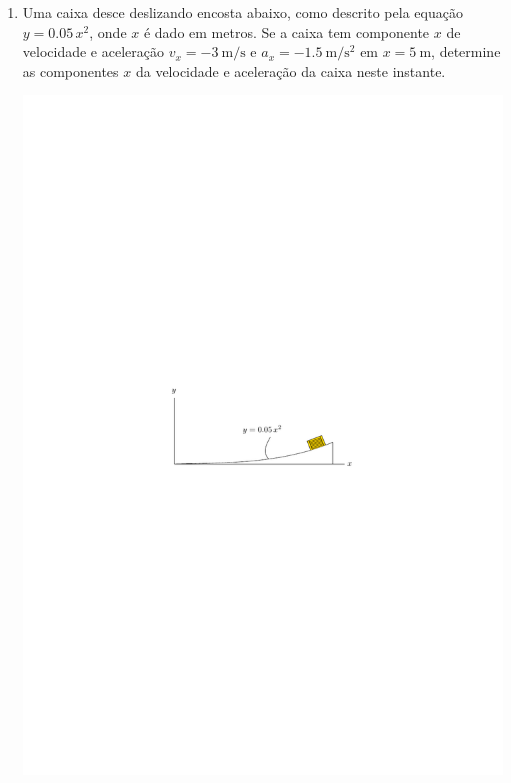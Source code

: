 \documentclass[a4paper,12pt]{article}
\begin{document}
\begin{enumerate}
		onde $v$ é dado em \SI{}{\meter/\second} e a direção positiva é para baixo. Se o corpo é solto a partir do repouso a uma altitude muito elevada, determine (a) a velocidade quando $t=\SI{5}{\second}$ e (b) a velocidade máxima possível ou final do corpo (quando $t\rightarrow\infty$)
		
		
		\textbf{Resposta}
		$
		\begin{cases}
		\text{(a) }v=\SI{45.5}{\meter/\second}\\
		\text{(b) }v=\SI{100}{\meter/\second}
		\end{cases}
		$
		
		\item Uma caixa desce deslizando encosta abaixo, como descrito pela equação $y=0.05\,x^{2}$, onde $x$ é dado em metros. Se a caixa tem componente $x$ de velocidade e aceleração $v_{x}=\SI{-3}{\meter/\second}$ e $a_{x}=\SI{-1.5}{\meter/\second^{2}}$ em $x=\SI{5}{\meter}$, determine as componentes $x$ da velocidade e aceleração da caixa neste instante.
		
		\vspace{-.5cm}
		\begin{flushright}
			\includegraphics[scale=1.3]{images/draw_2.pdf}
		\end{flushright}
		

\end{enumerate}
\end{document}
